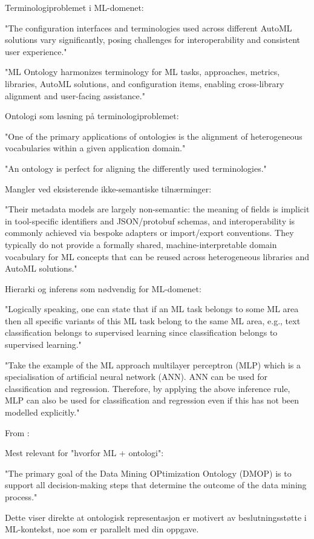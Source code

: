 Terminologiproblemet i ML-domenet:

"The configuration interfaces and terminologies used across different AutoML solutions vary significantly, posing challenges for interoperability and consistent user experience."

"ML Ontology harmonizes terminology for ML tasks, approaches, metrics, libraries, AutoML solutions, and configuration items, enabling cross-library alignment and user-facing assistance."

Ontologi som løsning på terminologiproblemet:

"One of the primary applications of ontologies is the alignment of heterogeneous vocabularies within a given application domain."

"An ontology is perfect for aligning the differently used terminologies."

Mangler ved eksisterende ikke-semantiske tilnærminger:

"Their metadata models are largely non-semantic: the meaning of fields is implicit in tool-specific identifiers and JSON/protobuf schemas, and interoperability is commonly achieved via bespoke adapters or import/export conventions. They typically do not provide a formally shared, machine-interpretable domain vocabulary for ML concepts that can be reused across heterogeneous libraries and AutoML solutions."

Hierarki og inferens som nødvendig for ML-domenet:

"Logically speaking, one can state that if an ML task belongs to some ML area then all specific variants of this ML task belong to the same ML area, e.g., text classification belongs to supervised learning since classification belongs to supervised learning."

"Take the example of the ML approach multilayer perceptron (MLP) which is a specialisation of artificial neural network (ANN). ANN can be used for classification and regression. Therefore, by applying the above inference rule, MLP can also be used for classification and regression even if this has not been modelled explicitly."

From \parencite{keet2015data_mining_optimization_ontology} :

Mest relevant for "hvorfor ML + ontologi":

"The primary goal of the Data Mining OPtimization Ontology (DMOP) is to support all decision-making steps that determine the outcome of the data mining process."

Dette viser direkte at ontologisk representasjon er motivert av beslutningsstøtte i ML-kontekst, noe som er parallelt med din oppgave.

